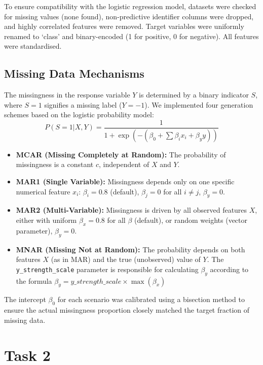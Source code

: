 \documentclass{article}
\begin{document}
To ensure compatibility with the logistic regression model, datasets were checked for missing values (none found), non-predictive identifier columns were dropped, and highly correlated features were removed. Target variables were uniformly renamed to `class' and binary-encoded (1 for positive, 0 for negative). All features were standardised.

\subsection{Missing Data Mechanisms}
The missingness in the response variable $Y$ is determined by a binary indicator $S$, where $S=1$ signifies a missing label ($Y=-1$). We implemented four generation schemes based on the logistic probability model:
\[ P(S=1|X,Y) = \frac{1}{1 + \exp(-(\beta_0 + \sum \beta_i x_i + \beta_y y))} \]

\begin{itemize}
\item \textbf{MCAR (Missing Completely at Random):} The probability of missingness is a constant $c$, independent of $X$ and $Y$.
\item \textbf{MAR1 (Single Variable):} Missingness depends only on one specific numerical feature $x_i$: $\beta_i=0.8$ (default), $\beta_j=0$ for all $i \neq j$, $\beta_y=0$.
\item \textbf{MAR2 (Multi-Variable):} Missingness is driven by all observed features $X$, either with uniform $\beta_x = 0.8$ for all $\beta$ (default), or random weights (vector parameter), $\beta_y=0$.
\item \textbf{MNAR (Missing Not at Random):} The probability depends on both features $X$ (as in MAR) and the true (unobserved) value of $Y$. The \texttt{y\_strength\_scale} parameter is responsible for calculating $\beta_y$ according to the formula $\beta_y = y\_strength\_scale  \times \max(\beta_x)$ 
\end{itemize}

The intercept $\beta_0$ for each scenario was calibrated using a bisection method to ensure the actual missingness proportion closely matched the target fraction of missing data.

\section{Task 2}
\end{document}
